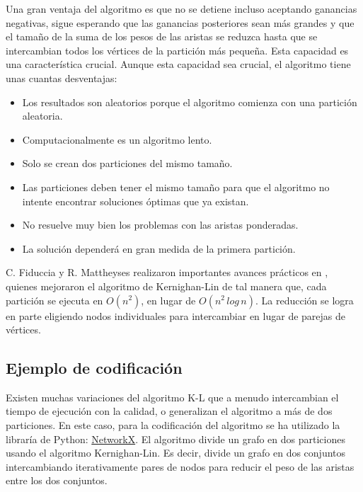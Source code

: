 Una gran ventaja del algoritmo es que no se detiene incluso aceptando ganancias negativas, sigue esperando que las ganancias posteriores sean más grandes y que el tamaño de la suma de los pesos de las aristas se reduzca hasta que se intercambian todos los vértices de la partición más pequeña. Esta capacidad es una característica crucial. Aunque esta capacidad sea crucial, el algoritmo tiene unas cuantas desventajas:

\begin{itemize}
	\item Los resultados son aleatorios porque el algoritmo comienza con una partición aleatoria.
	\item Computacionalmente es un algoritmo lento.
	\item Solo se crean dos particiones del mismo tamaño.
	\item Las particiones deben tener el mismo tamaño para que el algoritmo no intente encontrar soluciones óptimas que ya existan.
	\item No resuelve muy bien los problemas con las aristas ponderadas.
	\item La solución dependerá en gran medida de la primera partición.
\end{itemize}

C. Fiduccia y R. Mattheyses realizaron importantes avances prácticos en \cite{FiducciaMattheyses}, quienes mejoraron el algoritmo de  Kernighan-Lin\cite{KernighanLin} de tal manera que, cada partición se ejecuta en $O({n}^2)$, en lugar de $O({n}^2 \, log \, n)$. La reducción se logra en parte eligiendo nodos individuales para intercambiar en lugar de parejas de vértices.

\subsection{Ejemplo de codificación}

Existen muchas variaciones del algoritmo K-L que a menudo intercambian el tiempo de ejecución con la calidad, o generalizan el algoritmo a más de dos particiones. En este caso, para la codificación del algoritmo se ha utilizado la libraría de Python: \href{https://networkx.github.io/documentation/stable/reference/algorithms/generated/networkx.algorithms.community.kernighan_lin.kernighan_lin_bisection.html}{NetworkX}. El algoritmo divide un grafo en dos particiones usando el algoritmo Kernighan-Lin\cite{KernighanLin}. Es decir, divide un grafo en dos conjuntos intercambiando iterativamente pares de nodos para reducir el peso de las aristas entre los dos conjuntos.

